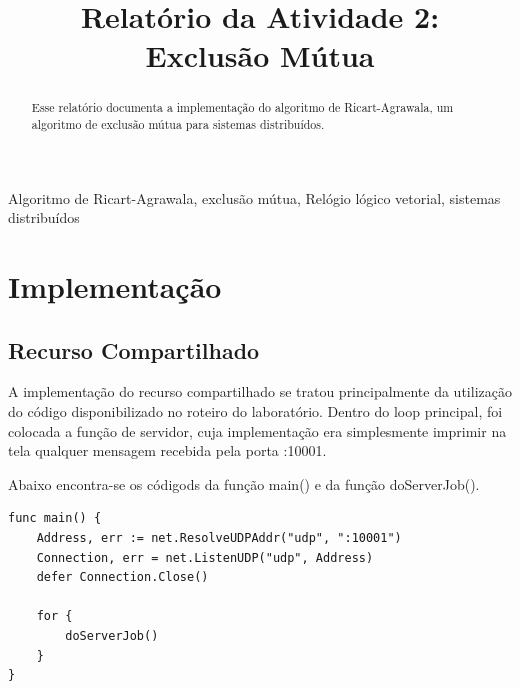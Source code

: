 \documentclass[conference]{IEEEtran}
\begin{document}
\title{Relatório da Atividade 2: \\ Exclusão Mútua\\
}

\author{
}

\maketitle

\begin{abstract}
Esse relatório documenta a implementação do algoritmo de Ricart-Agrawala, um algoritmo de exclusão mútua para sistemas distribuídos.
\end{abstract}

\begin{IEEEkeywords}
Algoritmo de Ricart-Agrawala, exclusão mútua, Relógio lógico vetorial, sistemas distribuídos
\end{IEEEkeywords}

\section{Implementação}

\subsection{Recurso Compartilhado}
	
	A implementação do recurso compartilhado se tratou principalmente da utilização do código disponibilizado no roteiro do laboratório. Dentro do loop principal, foi colocada a função de servidor, cuja implementação era simplesmente imprimir na tela qualquer mensagem recebida pela porta :10001.
	
	Abaixo encontra-se os códigods da função main() e da função doServerJob().
	
\begin{lstlisting}
func main() {
	Address, err := net.ResolveUDPAddr("udp", ":10001")
	Connection, err = net.ListenUDP("udp", Address)
	defer Connection.Close()

	for {
		doServerJob()
	}
}
\end{lstlisting}
\end{document}
